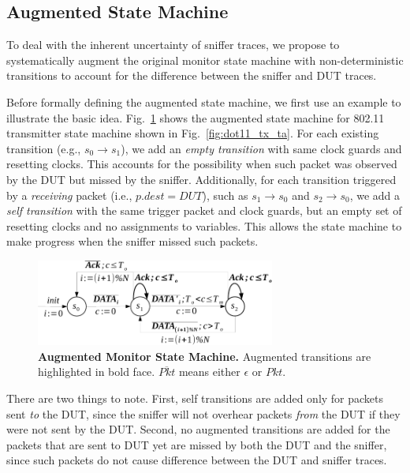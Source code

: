 \subsection{Augmented State Machine}
\label{subsec:augment}

To deal with the inherent uncertainty of sniffer traces, we propose to
systematically augment the original monitor state machine with non-deterministic
transitions to account for the difference between the sniffer and DUT traces.


Before formally defining the augmented state machine, we first use an example to
illustrate the basic idea. Fig.~\ref{fig:augment} shows the augmented state
machine for 802.11 transmitter state machine shown in
Fig.~\ref{fig:dot11_tx_ta}.  For each existing transition (e.g., $s_0\rightarrow
s_1$), we add an \textit{empty transition} with same clock guards and resetting
clocks.  This accounts for the possibility when such packet was observed by
the DUT but missed by the sniffer.  Additionally, for each transition triggered
by a \textit{receiving} packet (i.e., $p.dest = DUT$), such as $s_1\rightarrow
s_0$ and $s_2\rightarrow s_0$, we add a \textit{self transition} with the same
trigger packet and clock guards, but an empty set of resetting clocks and no
assignments to variables. This allows the state machine to make progress when
the sniffer missed such packets.

\begin{figure}[t!]
  \centering
  \includegraphics[width=0.7\textwidth]{./figures/dot11_tx_checker.pdf}
  \caption{\textbf{Augmented Monitor State Machine.} Augmented transitions are
  highlighted in bold face. $\overline{Pkt}$ means either $\epsilon$ or $Pkt$.}
  \label{fig:augment}
\end{figure}


There are two things to note. First, self transitions are added only for
packets sent \textit{to} the DUT, since the sniffer will not overhear packets
\textit{from} the DUT if they were not sent by the DUT. Second, no augmented
transitions are added for the packets that are sent to DUT yet are missed by both
the DUT and the sniffer, since such packets do not cause difference between the
DUT and sniffer traces.


